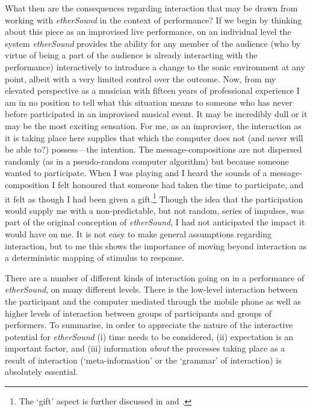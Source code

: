 What then are the consequences regarding interaction that may be drawn from working with \emph{etherSound} in the context of performance? If we begin by thinking about this piece as an improvised live performance, on an individual level the system \emph{etherSound} provides the ability for any member of the audience (who by virtue of being a part of the audience is already interacting with the performance) interactively to introduce a change to the sonic environment at any point, albeit with a very limited control over the outcome. Now, from my elevated perspective as a musician with fifteen years of professional experience I am in no position to tell what this situation means to someone who has never before participated in an improvised musical event. It may be incredibly dull or it may be the most exciting sensation. For me, as an improviser, the interaction as it is taking place here supplies that which the computer does not (and never will be able to?) possess---the intention. The message-compositions are not dispersed randomly (as in a pseudo-random computer algorithm) but because someone wanted to participate. 
When I was playing and I heard the sounds of a message-composition I felt honoured that someone had taken the time to participate, and it felt as though I had been given a gift.\footnote{The `gift' aspect is further discussed in \cite{frisk05} and \cite{yoshida06}.} Though the idea that the participation would supply me with a non-predictable, but not random, series of impulses, was part of the original conception of \emph{etherSound}, I had not anticipated the impact it would have on me. It is not easy to make general assumptions regarding interaction, but to me this shows the importance of moving beyond interaction as a deterministic mapping of stimulus to response.

There are a number of different kinds of interaction going on in a performance of \emph{etherSound}, on many different levels. There is the low-level interaction between the participant and the computer mediated through the mobile phone as well as higher levels of interaction between groups of participants and groups of performers. To summarise, in order to appreciate the nature of the interactive potential for \emph{etherSound} (i) time needs to be considered, (ii) expectation is an important factor, and (iii) information \emph{about} the processes taking place as a result of interaction (`meta-information' or the `grammar' of interaction) is absolutely essential. 

